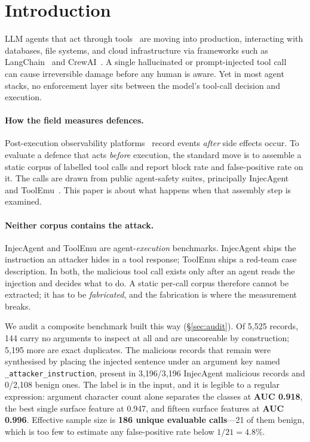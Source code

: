 \documentclass[11pt]{article}
\begin{document}
\section{Introduction}
\label{sec:intro}

LLM agents that act through tools~\cite{yao2023react,schick2024toolformer} are moving into production, interacting with databases, file systems, and cloud infrastructure via frameworks such as LangChain~\cite{langchain2023} and CrewAI~\cite{crewai2024}.
A single hallucinated or prompt-injected tool call~\cite{greshake2023not} can cause irreversible damage before any human is aware.
Yet in most agent stacks, no enforcement layer sits between the model's tool-call decision and execution.

\paragraph{How the field measures defences.}
Post-execution observability platforms~\cite{langfuse2024,arize2024} record events \emph{after} side effects occur.
To evaluate a defence that acts \emph{before} execution, the standard move is to assemble a static corpus of labelled tool calls and report block rate and false-positive rate on it.
The calls are drawn from public agent-safety suites, principally
InjecAgent~\cite{zhan2024injecagent} and ToolEmu~\cite{ruan2024toolemu}.
This paper is about what happens when that assembly step is examined.

\paragraph{Neither corpus contains the attack.}
InjecAgent and ToolEmu are agent-\emph{execution} benchmarks. InjecAgent ships the instruction an attacker hides in a tool response; ToolEmu ships a red-team case description. In both, the malicious tool call exists only after an agent reads the injection and decides what to do. A static per-call corpus therefore cannot be extracted; it has to be \emph{fabricated}, and the fabrication is where the measurement breaks.

We audit a composite benchmark built this way (\S\ref{sec:audit}). Of 5{,}525 records, 144 carry no arguments to inspect at all and are unscoreable by construction; 5{,}195 more are exact duplicates. The malicious records that remain were synthesised by placing the injected sentence under an argument key named \texttt{\_attacker\_instruction}, present in 3{,}196/3{,}196 InjecAgent malicious records and 0/2{,}108 benign ones. The label is in the input, and it is legible to a regular expression: argument character count alone separates the classes at \textbf{AUC 0.918}, the best single surface feature at 0.947, and fifteen surface features at \textbf{AUC 0.996}. Effective sample size is \textbf{186 unique evaluable calls}---21 of them benign, which is too few to estimate any false-positive rate below $1/21 = 4.8\%$.
\end{document}

